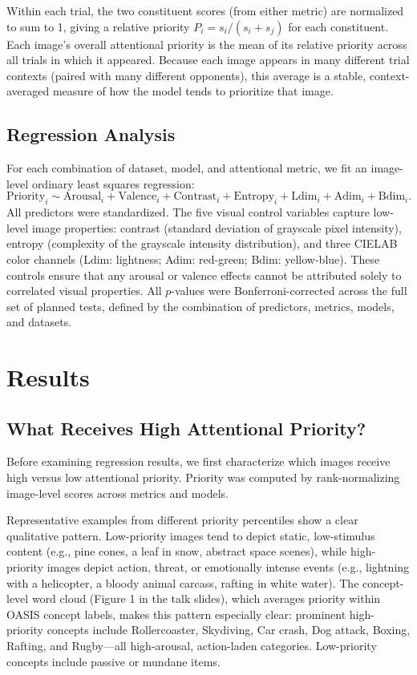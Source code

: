 \documentclass[12pt]{article}
\begin{document}
Within each trial, the two constituent scores (from either metric) are normalized to sum to 1, giving a relative priority $P_i = s_i / (s_i + s_j)$ for each constituent. Each image's overall attentional priority is the mean of its relative priority across all trials in which it appeared. Because each image appears in many different trial contexts (paired with many different opponents), this average is a stable, context-averaged measure of how the model tends to prioritize that image.

\subsection{Regression Analysis}

For each combination of dataset, model, and attentional metric, we fit an image-level ordinary least squares regression:
\[
\text{Priority}_i \sim \text{Arousal}_i + \text{Valence}_i + \text{Contrast}_i + \text{Entropy}_i + \text{Ldim}_i + \text{Adim}_i + \text{Bdim}_i.
\]
All predictors were standardized. The five visual control variables capture low-level image properties: contrast (standard deviation of grayscale pixel intensity), entropy (complexity of the grayscale intensity distribution), and three CIELAB color channels (Ldim: lightness; Adim: red-green; Bdim: yellow-blue). These controls ensure that any arousal or valence effects cannot be attributed solely to correlated visual properties. All $p$-values were Bonferroni-corrected across the full set of planned tests, defined by the combination of predictors, metrics, models, and datasets.

\section{Results}

\subsection{What Receives High Attentional Priority?}

Before examining regression results, we first characterize which images receive high versus low attentional priority. Priority was computed by rank-normalizing image-level scores across metrics and models.

Representative examples from different priority percentiles show a clear qualitative pattern. Low-priority images tend to depict static, low-stimulus content (e.g., pine cones, a leaf in snow, abstract space scenes), while high-priority images depict action, threat, or emotionally intense events (e.g., lightning with a helicopter, a bloody animal carcass, rafting in white water). The concept-level word cloud (Figure 1 in the talk slides), which averages priority within OASIS concept labels, makes this pattern especially clear: prominent high-priority concepts include Rollercoaster, Skydiving, Car crash, Dog attack, Boxing, Rafting, and Rugby---all high-arousal, action-laden categories. Low-priority concepts include passive or mundane items.
\end{document}

